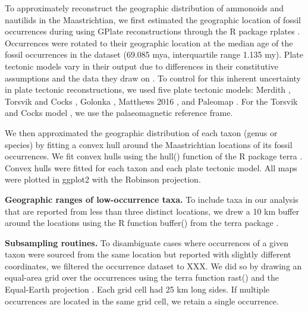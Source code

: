 \documentclass[a4paper]{article}
\begin{document}
To approximately reconstruct the geographic distribution of ammonoids and nautilids in the Maastrichtian, we first estimated the geographic location of fossil occurrences during  using GPlate reconstructions through the R package rplates \parencite{kocsisRgplatesInterfaceGPlates2025, mullerGPlatesBuildingVirtual2018}. Occurrences were rotated to their geographic location at the median age of the fossil occurrences in the dataset (69.085 mya, interquartile range 1.135 my). Plate tectonic models vary in their output due to differences in their constitutive assumptions and the data they draw on \parencite{setonDeconstructingPlateTectonic2023}. 
To control for this inherent uncertainty in plate tectonic reconstructions, we used five plate tectonic models:
Merdith \parencite{merdithExtendingFullplateTectonic2021},
Torsvik and Cocks \parencite{torsvikEarthHistoryPalaeogeography2016},
Golonka \parencite{wrightCommunitydrivenPaleogeographicReconstructions2013},
Matthews 2016 \parencite{matthewsGlobalPlateBoundary2016}, and
Paleomap \parencite{scotesePALEOMAPPaleoAtlasGPlates2020}.
For the Torsvik and Cocks model \parencite{torsvikEarthHistoryPalaeogeography2016}, we use the palaeomagnetic reference frame. 

We then approximated the geographic distribution of each taxon (genus or species) by fitting a convex hull around the Maastrichtian locations of its fossil occurrences. We fit convex hulls using the hull() function of the R package terra \parencite{hijmansTerraSpatialData2025}. Convex hulls were fitted for each taxon and each plate tectonic model. All maps were plotted in ggplot2 \parencite{wickhamGgplot2ElegantGraphics2016} with the Robinson projection.


\textbf{Geographic ranges of low-occurrence taxa.} To include taxa in our analysis that are reported from less than three distinct locations, we drew a 10 km buffer \parencite{caseyEffectsGeographicRange2021, myersSharksThatPass2010, hendricksUsingGISStudy2008, malanoskiClimateChangeImportant2024} around the locations using the R function buffer() from the terra package \parencite{hijmansTerraSpatialData2025}.  


\textbf{Subsampling routines.} 
To disambiguate cases where occurrences of a given taxon were sourced from the same location but reported with slightly different coordinates, we filtered the occurrence dataset to XXX. We did so by drawing an equal-area grid over the occurrences using the terra function rast() and the Equal-Earth projection \parencite{savricEqualEarthMap2019}. Each grid cell had 25 km long sides.  
If multiple occurrences are located in the same grid cell, we retain a single occurrence. 
\end{document}
